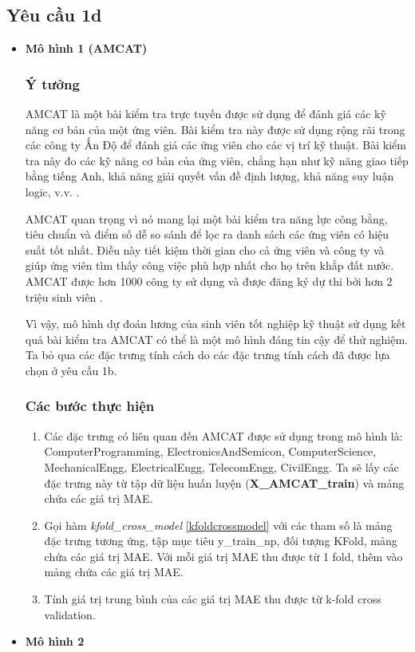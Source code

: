 \documentclass[]{article}
\begin{document}
\subsection{Yêu cầu 1d}
\begin{itemize}
  \item \textbf{Mô hình 1 (AMCAT)}
  \subsubsection{Ý tưởng}
  AMCAT là một bài kiểm tra trực tuyến được sử dụng để đánh giá các kỹ năng cơ bản của một ứng viên. Bài kiểm tra này được sử dụng rộng rãi trong các công ty Ấn Độ để đánh giá các ứng viên cho các vị trí kỹ thuật. Bài kiểm tra này đo các kỹ năng cơ bản của ứng viên, chẳng hạn như kỹ năng giao tiếp bằng tiếng Anh, khả năng giải quyết vấn đề định lượng, khả năng suy luận logic, v.v. \cite{kaggleEngineeringGraduate}.

  AMCAT quan trọng vì nó mang lại một bài kiểm tra năng lực công bằng, tiêu chuẩn và điểm số dễ so sánh để lọc ra danh sách các ứng viên có hiệu suất tốt nhất. Điều này tiết kiệm thời gian cho cả ứng viên và công ty và giúp ứng viên tìm thấy công việc phù hợp nhất cho họ trên khắp đất nước. AMCAT được hơn 1000 công ty sử dụng và được đăng ký dự thi bởi hơn 2 triệu sinh viên \cite{getmyuniAMCATUseful}.

  Vì vậy, mô hình dự đoán lương của sinh viên tốt nghiệp kỹ thuật sử dụng kết quả bài kiểm tra AMCAT có thể là một mô hình đáng tin cậy để thử nghiệm. Ta bỏ qua các đặc trưng tính cách do các đặc trưng tính cách đã được lựa chọn ở yêu cầu 1b.
  \subsubsection{Các bước thực hiện}
  \begin{enumerate}
    \item Các đặc trưng có liên quan đến AMCAT được sử dụng trong mô hình là: ComputerProgramming, ElectronicsAndSemicon, ComputerScience, MechanicalEngg, ElectricalEngg, TelecomEngg, CivilEngg. Ta sẽ lấy các đặc trưng này từ tập dữ liệu huấn luyện (\textbf{X\_AMCAT\_train}) và mảng chứa các giá trị MAE.
    \item Gọi hàm \textit{kfold\_cross\_model} \ref{kfoldcrossmodel} với các tham số là mảng đặc trưng tương ứng, tập mục tiêu y\_train\_np, đối tượng KFold, mảng chứa các giá trị MAE. Với mỗi giá trị MAE thu được từ 1 fold, thêm vào mảng chứa các giá trị MAE.
    \item Tính giá trị trung bình của các giá trị MAE thu được từ k-fold cross validation.
  \end{enumerate}
  \item \textbf{Mô hình 2}

\end{itemize}
\end{document}
